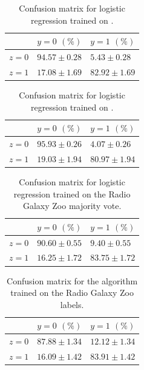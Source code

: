     \begin{table}
      \centering
      \begin{tabular}{l|ll}
          & $y = 0$  $(\%)$ & $y = 1$ $(\%)$ \\\hline
          $z = 0$ & $94.57 \pm 0.28$ & $5.43 \pm 0.28$\\
          $z = 1$ & $17.08 \pm 1.69$ & $82.92 \pm 1.69$
      \end{tabular}
      \caption{Confusion matrix for logistic regression trained on
        \citeauthor{norris06}.}
      \label{tab:cm-lr-norris}
    \end{table}

    \begin{table}
      \centering
      \begin{tabular}{l|ll}
          & $y = 0$  $(\%)$ & $y = 1$ $(\%)$ \\\hline
          $z = 0$ & $95.93 \pm 0.26$ & $4.07 \pm 0.26$\\
          $z = 1$ & $19.03 \pm 1.94$ & $80.97 \pm 1.94$
      \end{tabular}
      \caption{Confusion matrix for logistic regression trained on
        \citeauthor{fan15}.}
      \label{tab:cm-lr-fan}
    \end{table}

    \begin{table}
      \centering
      \begin{tabular}{l|ll}
          & $y = 0$  $(\%)$ & $y = 1$ $(\%)$ \\\hline
          $z = 0$ & $90.60 \pm 0.55$ & $9.40 \pm 0.55$\\
          $z = 1$ & $16.25 \pm 1.72$ & $83.75 \pm 1.72$\\
      \end{tabular}
      \caption{Confusion matrix for logistic regression trained on the Radio
        Galaxy Zoo majority vote.}
      \label{tab:cm-lr-rgz-mv}
    \end{table}

    \begin{table}
      \centering
      \begin{tabular}{l|ll}
          & $y = 0$  $(\%)$ & $y = 1$ $(\%)$ \\\hline
          $z = 0$ & $87.88 \pm 1.34$ & $12.12 \pm 1.34$\\
          $z = 1$ & $16.09 \pm 1.42$ & $83.91 \pm 1.42$\\
      \end{tabular}
      \caption{Confusion matrix for the \citeauthor{raykar10} algorithm trained
        on the Radio Galaxy Zoo labels.}
      \label{tab:cm-raykar-rgz-raw}
    \end{table}

